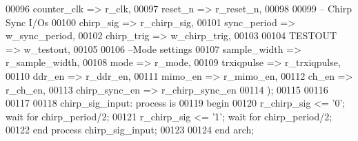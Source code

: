 \begin{DoxyCode}
00096         counter_clk             => r_clk,
00097         reset_n             => r_reset_n,
00098 
00099 \textcolor{keyword}{        -- Chirp Sync I/Os}
00100         chirp_sig               => r_chirp_sig,
00101         sync_period             => w_sync_period,
00102         chirp_trig              => w_chirp_trig,
00103         
00104         TESTOUT                 => w_testout,
00105             
00106 \textcolor{keyword}{        --Mode settings}
00107         sample_width         => r_sample_width,
00108         mode                 => r_mode,
00109         trxiqpulse           => r_trxiqpulse,
00110         ddr_en               => r_ddr_en,
00111         mimo_en              => r_mimo_en,
00112         ch_en                => r_ch_en,
00113         chirp_sync_en           => r_chirp_sync_en
00114     \textcolor{vhdlchar}{)};
00115     
00116     
00117     
00118 chirp\_sig\_input: \textcolor{keywordflow}{process} \textcolor{keywordflow}{is}
00119 \textcolor{vhdlkeyword}{begin}
00120     \textcolor{vhdlchar}{r_chirp_sig} \textcolor{vhdlchar}{<=} \textcolor{vhdlchar}{'}\textcolor{vhdllogic}{}\textcolor{vhdllogic}{0}\textcolor{vhdlchar}{'}; \textcolor{keywordflow}{wait} \textcolor{keywordflow}{for} \textcolor{vhdlchar}{chirp_period}\textcolor{vhdlchar}{/}\textcolor{vhdllogic}{}\textcolor{vhdllogic}{2};
00121      \textcolor{vhdlchar}{r_chirp_sig} \textcolor{vhdlchar}{<=} \textcolor{vhdlchar}{'}\textcolor{vhdllogic}{}\textcolor{vhdllogic}{1}\textcolor{vhdlchar}{'}; \textcolor{keywordflow}{wait} \textcolor{keywordflow}{for} \textcolor{vhdlchar}{chirp_period}\textcolor{vhdlchar}{/}\textcolor{vhdllogic}{}\textcolor{vhdllogic}{2};
00122 \textcolor{keywordflow}{end} \textcolor{keywordflow}{process} \textcolor{vhdlchar}{chirp\_sig\_input};
00123 
00124 \textcolor{keywordflow}{end} \textcolor{vhdlchar}{arch};   
\end{DoxyCode}
